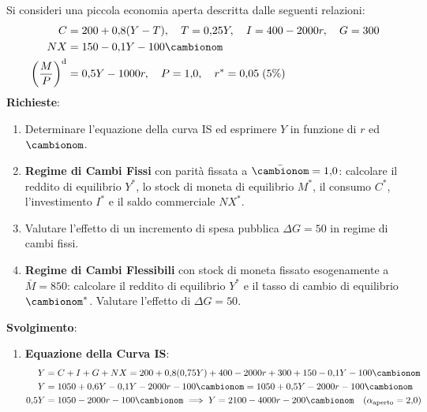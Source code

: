 \begin{esercizio}
Si consideri una piccola economia aperta descritta dalle seguenti relazioni:
\begin{align*}
    C &= 200 + 0{,}8(Y - T), \quad T = 0{,}25 Y, \quad I = 400 - 2000 r, \quad G = 300 \\
    NX &= 150 - 0{,}1 Y - 100 \cambionom \\
    \left(\frac{M}{P}\right)^{\mathrm{d}} &= 0{,}5 Y - 1000 r, \quad P = 1{,}0, \quad r^* = 0{,}05 \; (5\%)
\end{align*}
\textbf{Richieste}:
\begin{enumerate}
    \item Determinare l'equazione della curva IS ed esprimere $Y$ in funzione di $r$ ed $\cambionom$.
    \item \textbf{Regime di Cambi Fissi} con parità fissata a $\bar{\cambionom} = 1{,}0$: calcolare il reddito di equilibrio $Y^*$, lo stock di moneta di equilibrio $M^*$, il consumo $C^*$, l'investimento $I^*$ e il saldo commerciale $NX^*$.
    \item Valutare l'effetto di un incremento di spesa pubblica $\Delta G = 50$ in regime di cambi fissi.
    \item \textbf{Regime di Cambi Flessibili} con stock di moneta fissato esogenamente a $\bar{M} = 850$: calcolare il reddito di equilibrio $Y^*$ e il tasso di cambio di equilibrio $\cambionom^*$. Valutare l'effetto di $\Delta G = 50$.
\end{enumerate}

\textbf{Svolgimento}:
\begin{enumerate}
    \item \textbf{Equazione della Curva IS}:
    \begin{align*}
        Y &= C + I + G + NX = 200 + 0{,}8(0{,}75 Y) + 400 - 2000 r + 300 + 150 - 0{,}1 Y - 100 \cambionom \\
        Y &= 1050 + 0{,}6 Y - 0{,}1 Y - 2000 r - 100 \cambionom = 1050 + 0{,}5 Y - 2000 r - 100 \cambionom \\
        0{,}5 Y &= 1050 - 2000 r - 100 \cambionom \implies Y = 2100 - 4000 r - 200 \cambionom \quad (\alpha_{\text{aperto}} = 2{,}0)
    \end{align*}


\end{enumerate}
\end{esercizio}
